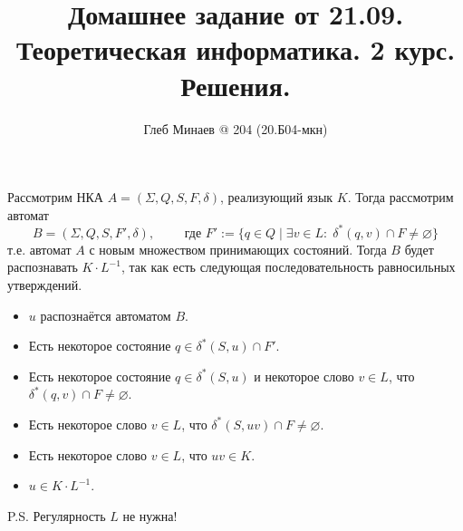 \documentclass[12pt,a4paper]{article}
\title{Домашнее задание от 21.09.\\Теоретическая информатика. 2 курс.\\Решения.}
\author{Глеб Минаев @ 204 (20.Б04-мкн)}
\begin{document}
    \maketitle

    \begin{multicols}{2}
        \tableofcontents
    \end{multicols}

    \begin{problem}{3}
        Рассмотрим НКА $A = (\Sigma, Q, S, F, \delta)$, реализующий язык $K$. Тогда рассмотрим автомат
        \[B = (\Sigma, Q, S, F', \delta), \qquad \text{ где } F' := \{q \in Q \mid \exists v \in L\colon\; \delta^*(q, v) \cap F \neq \varnothing\}\]
        т.е. автомат $A$ с новым множеством принимающих состояний. Тогда $B$ будет распознавать $K \cdot L^{-1}$, так как есть следующая последовательность равносильных утверждений.
        \begin{itemize}
            \item $u$ распознаётся автоматом $B$.
            \item Есть некоторое состояние $q \in \delta^*(S, u) \cap F'$.
            \item Есть некоторое состояние $q \in \delta^*(S, u)$ и некоторое слово $v \in L$, что $\delta^*(q, v) \cap F \neq \varnothing$.
            \item Есть некоторое слово $v \in L$, что $\delta^*(S, uv) \cap F \neq \varnothing$.
            \item Есть некоторое слово $v \in L$, что $uv \in K$.
            \item $u \in K \cdot L^{-1}$.
        \end{itemize}

        P.S. Регулярность $L$ не нужна!
    \end{problem}
\end{document}
